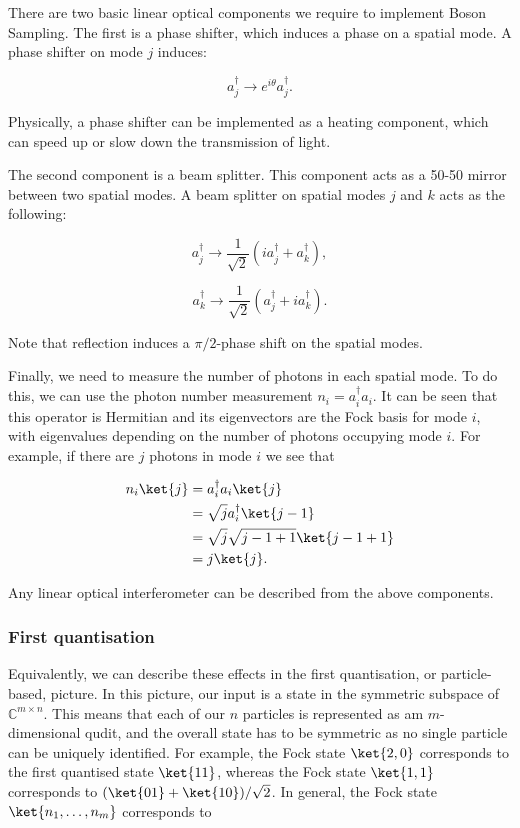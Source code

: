 There are two basic linear optical components we require to implement Boson Sampling. The first is a phase shifter, which induces a phase on a spatial mode. A phase shifter on mode $j$ induces:

\begin{equation}
a_j^\dagger \rightarrow e^{i\theta}a_j^\dagger.
\end{equation}

Physically, a phase shifter can be implemented as a heating component, which can speed up or slow down the transmission of light.

The second component is a beam splitter. This component acts as a 50-50 mirror between two spatial modes. A beam splitter on spatial modes $j$ and $k$ acts as the following:

\begin{equation}
a_j^\dagger \rightarrow \frac{1}{\sqrt{2}}(ia_j^\dagger + a_k^\dagger),
\end{equation}

\begin{equation}
a_k^\dagger \rightarrow \frac{1}{\sqrt{2}}(a_j^\dagger + ia_k^\dagger).
\end{equation}

Note that reflection induces a $\pi/2$-phase shift on the spatial modes.

Finally, we need to measure the number of photons in each spatial mode. To do this, we can use the photon number measurement $n_i = a_i^\dagger a_i$. It can be seen that this operator is Hermitian and its eigenvectors are the Fock basis for mode $i$, with eigenvalues depending on the number of photons occupying mode $i$. For example, if there are $j$ photons in mode $i$ we see that

\begin{align}
n_i\ket{j} &= a_i^\dagger a_i\ket{j}\\
&= \sqrt{j}a_i^\dagger\ket{j-1}\\
&= \sqrt{j}\sqrt{j-1+1}\ket{j-1+1}\\
&= j\ket{j}.
\end{align}

Any linear optical interferometer can be described from the above components.

\subsubsection{First quantisation}

Equivalently, we can describe these effects in the first quantisation, or particle-based, picture. In this picture, our input is a state in the symmetric subspace of $\mathbb{C}^{m\times n}$. This means that each of our $n$ particles is represented as am $m$-dimensional qudit, and the overall state has to be symmetric as no single particle can be uniquely identified. For example, the Fock state $\ket{2,0}$ corresponds to the first quantised state $\ket{11}$, whereas the Fock state $\ket{1,1}$ corresponds to $(\ket{01} + \ket{10})/\sqrt{2}$. In general, the Fock state $\ket{n_1,\dots,n_m}$ corresponds to

